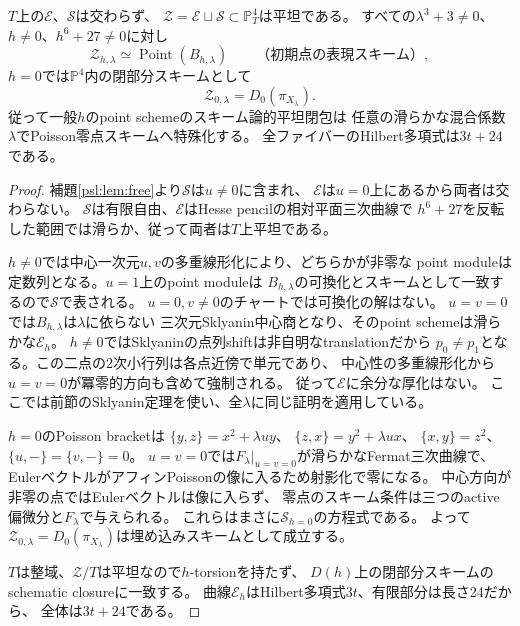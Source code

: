\begin{theorem}[任意の滑らかな混合係数での平坦極限]
\label{psl:thm:universal-flat}
$T$上の$\mathcal E$、$\mathcal S$は交わらず、
$\mathcal Z=\mathcal E\sqcup\mathcal S\subset\mathbb P^4_T$は平坦である。
すべての$\lambda^3+3\ne0$、$h\ne0$、$h^6+27\ne0$に対し
\[
 \mathcal Z_{h,\lambda}\simeq
 \operatorname{Point}(B_{h,\lambda})
 \qquad\text{（初期点の表現スキーム）},
 \tag{PL6}\label{psl:eq:point}
\]
$h=0$では$\mathbb P^4$内の閉部分スキームとして
\[
 \boxed{\quad \mathcal Z_{0,\lambda}=D_0(\pi_{X_\lambda}).\quad}
 \tag{PL7}\label{psl:eq:limit}
\]
従って一般$h$のpoint schemeのスキーム論的平坦閉包は
任意の滑らかな混合係数$\lambda$でPoisson零点スキームへ特殊化する。
全ファイバーのHilbert多項式は$3t+24$である。
\end{theorem}
\begin{proof}
補題\ref{psl:lem:free}より$\mathcal S$は$u\ne0$に含まれ、
$\mathcal E$は$u=0$上にあるから両者は交わらない。
$\mathcal S$は有限自由、$\mathcal E$はHesse pencilの相対平面三次曲線で
$h^6+27$を反転した範囲では滑らか、従って両者は$T$上平坦である。

$h\ne0$では中心一次元$u,v$の多重線形化により、どちらかが非零な
point moduleは定数列となる。$u=1$上のpoint moduleは
$B_{h,\lambda}$の可換化とスキームとして一致するので$\mathcal S$で表される。
$u=0,v\ne0$のチャートでは可換化の解はない。
$u=v=0$では$B_{h,\lambda}$は$\lambda$に依らない
三次元Sklyanin中心商となり、そのpoint schemeは滑らかな$\mathcal E_h$。
$h\ne0$ではSklyaninの点列shiftは非自明なtranslationだから
$p_0\ne p_1$となる。この二点の2次小行列は各点近傍で単元であり、
中心性の多重線形化から$u=v=0$が冪零的方向も含めて強制される。
従って$\mathcal E$に余分な厚化はない。
ここでは前節のSklyanin定理を使い、全$\lambda$に同じ証明を適用している。

$h=0$のPoisson bracketは
$\{y,z\}=x^2+\lambda uy$、
$\{z,x\}=y^2+\lambda ux$、
$\{x,y\}=z^2$、$\{u,-\}=\{v,-\}=0$。
$u=v=0$では$F_\lambda|_{u=v=0}$が滑らかなFermat三次曲線で、
EulerベクトルがアフィンPoissonの像に入るため射影化で零になる。
中心方向が非零の点ではEulerベクトルは像に入らず、
零点のスキーム条件は三つのactive偏微分と$F_\lambda$で与えられる。
これらはまさに$\mathcal S_{h=0}$の方程式である。
よって$\mathcal Z_{0,\lambda}=D_0(\pi_{X_\lambda})$は埋め込みスキームとして成立する。

$T$は整域、$\mathcal Z/T$は平坦なので$h$-torsionを持たず、
$D(h)$上の閉部分スキームのschematic closureに一致する。
曲線$\mathcal E_h$はHilbert多項式$3t$、有限部分は長さ24だから、
全体は$3t+24$である。
\end{proof}

